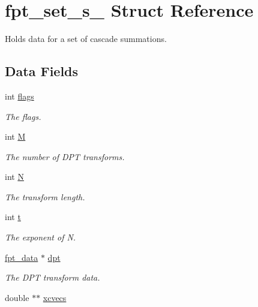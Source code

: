 \hypertarget{structfpt__set__s__}{
\section{fpt\_\-set\_\-s\_\- Struct Reference}
\label{structfpt__set__s__}
}
Holds data for a set of cascade summations.  


\subsection*{Data Fields}
\begin{CompactItemize}
\item 
\hypertarget{structfpt__set__s___o0}{
int \hyperlink{structfpt__set__s___o0}{flags}}
\label{structfpt__set__s___o0}

\begin{CompactList}\small\item\em The flags. \item\end{CompactList}\item 
\hypertarget{structfpt__set__s___o1}{
int \hyperlink{structfpt__set__s___o1}{M}}
\label{structfpt__set__s___o1}

\begin{CompactList}\small\item\em The number of DPT transforms. \item\end{CompactList}\item 
int \hyperlink{structfpt__set__s___o2}{N}
\begin{CompactList}\small\item\em The transform length. \item\end{CompactList}\item 
\hypertarget{structfpt__set__s___o3}{
int \hyperlink{structfpt__set__s___o3}{t}}
\label{structfpt__set__s___o3}

\begin{CompactList}\small\item\em The exponent of N. \item\end{CompactList}\item 
\hypertarget{structfpt__set__s___o4}{
\hyperlink{structfpt__data__}{fpt\_\-data} $\ast$ \hyperlink{structfpt__set__s___o4}{dpt}}
\label{structfpt__set__s___o4}

\begin{CompactList}\small\item\em The DPT transform data. \item\end{CompactList}\item 
\hypertarget{structfpt__set__s___o5}{
double $\ast$$\ast$ \hyperlink{structfpt__set__s___o5}{xcvecs}}
\label{structfpt__set__s___o5}


\end{CompactItemize}
